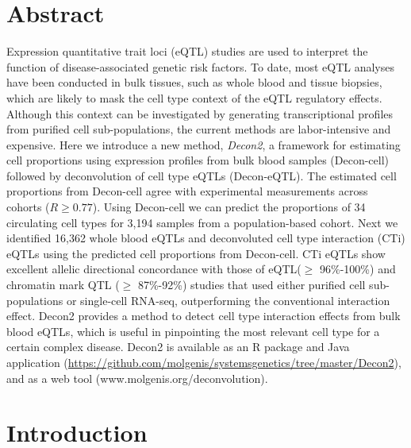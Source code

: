 \section*{Abstract}

Expression quantitative trait loci (eQTL) studies are used to interpret the function of disease-associated genetic risk factors. To date, most eQTL analyses have been conducted in bulk tissues, such as whole blood and tissue biopsies, which are likely to mask the cell type context of the eQTL regulatory effects. Although this context can be investigated by generating transcriptional profiles from purified cell sub-populations, the current methods are labor-intensive and expensive. Here we introduce a new method, \textit{Decon2}, a framework for estimating cell proportions using expression profiles from bulk blood samples (Decon-cell) followed by deconvolution of cell type eQTLs (Decon-eQTL). The estimated cell proportions from Decon-cell agree with experimental measurements across cohorts ($R \geq 0.77$). Using Decon-cell we can predict the proportions of 34 circulating cell types for 3,194 samples from a population-based cohort. Next we identified 16,362 whole blood eQTLs and deconvoluted cell type interaction (CTi) eQTLs using the predicted cell proportions from Decon-cell. CTi eQTLs show excellent allelic directional concordance with those of eQTL($\geq$ 96\%-100\%) and chromatin mark QTL ($\geq$ 87\%-92\%) studies that used either purified cell sub-populations or single-cell RNA-seq, outperforming the conventional interaction effect. Decon2 provides a method to detect cell type interaction effects from bulk blood eQTLs, which is useful in pinpointing the most relevant cell type for a certain complex disease. Decon2 is available as an R package and Java application (\url{https://github.com/molgenis/systemsgenetics/tree/master/Decon2}), and as a web tool (www.molgenis.org/deconvolution).


\section{Introduction}

